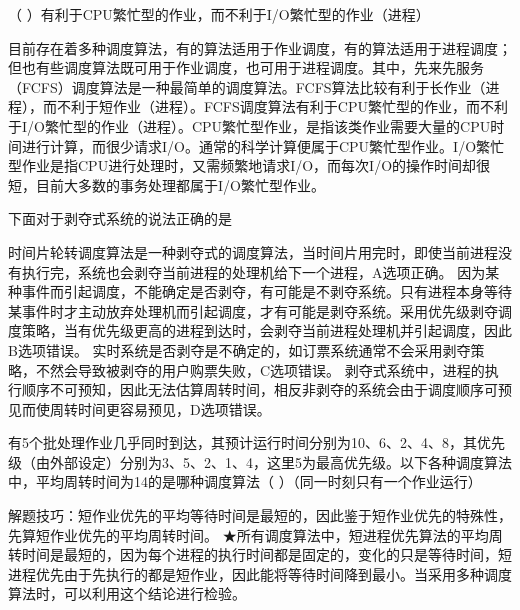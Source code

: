 \question （ ）有利于CPU繁忙型的作业，而不利于I/O繁忙型的作业（进程）
\par{}
\begin{solution}目前存在着多种调度算法，有的算法适用于作业调度，有的算法适用于进程调度；但也有些调度算法既可用于作业调度，也可用于进程调度。其中，先来先服务（FCFS）调度算法是一种最简单的调度算法。FCFS算法比较有利于长作业（进程），而不利于短作业（进程）。FCFS调度算法有利于CPU繁忙型的作业，而不利于I/O繁忙型的作业（进程）。CPU繁忙型作业，是指该类作业需要大量的CPU时间进行计算，而很少请求I/O。通常的科学计算便属于CPU繁忙型作业。I/O繁忙型作业是指CPU进行处理时，又需频繁地请求I/O，而每次I/O的操作时间却很短，目前大多数的事务处理都属于I/O繁忙型作业。
\end{solution}
\question 下面对于剥夺式系统的说法正确的是
\par{}
\begin{solution}时间片轮转调度算法是一种剥夺式的调度算法，当时间片用完时，即使当前进程没有执行完，系统也会剥夺当前进程的处理机给下一个进程，A选项正确。
因为某种事件而引起调度，不能确定是否剥夺，有可能是不剥夺系统。只有进程本身等待某事件时才主动放弃处理机而引起调度，才有可能是剥夺系统。采用优先级剥夺调度策略，当有优先级更高的进程到达时，会剥夺当前进程处理机并引起调度，因此B选项错误。
实时系统是否剥夺是不确定的，如订票系统通常不会采用剥夺策略，不然会导致被剥夺的用户购票失败，C选项错误。
剥夺式系统中，进程的执行顺序不可预知，因此无法估算周转时间，相反非剥夺的系统会由于调度顺序可预见而使周转时间更容易预见，D选项错误。
\end{solution}
\question 有5个批处理作业几乎同时到达，其预计运行时间分别为10、6、2、4、8，其优先级（由外部设定）分别为3、5、2、1、4，这里5为最高优先级。以下各种调度算法中，平均周转时间为14的是哪种调度算法（
）（同一时刻只有一个作业运行）
\par{}
\begin{solution}解题技巧：短作业优先的平均等待时间是最短的，因此鉴于短作业优先的特殊性，先算短作业优先的平均周转时间。
★所有调度算法中，短进程优先算法的平均周转时间是最短的，因为每个进程的执行时间都是固定的，变化的只是等待时间，短进程优先由于先执行的都是短作业，因此能将等待时间降到最小。当采用多种调度算法时，可以利用这个结论进行检验。
\end{solution}
